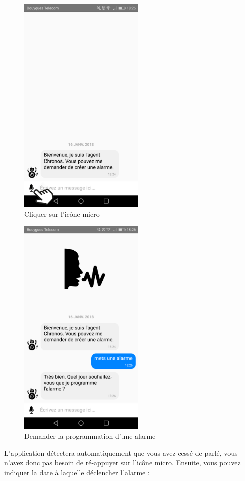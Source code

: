 \begin{figure}[H]
  \centering
  \includegraphics[width=6cm]{images/B.png}
  \caption{Cliquer sur l'icône micro}
\end{figure}

\begin{figure}[H]
  \centering
  \includegraphics[width=6cm]{images/C.png}
  \caption{Demander la programmation d'une alarme}
\end{figure}

L'application détectera automatiquement que vous avez cessé de parlé, vous n'avez donc pas besoin de ré-appuyer sur l'icône micro.
Ensuite, vous pouvez indiquer la date à laquelle déclencher l'alarme :

